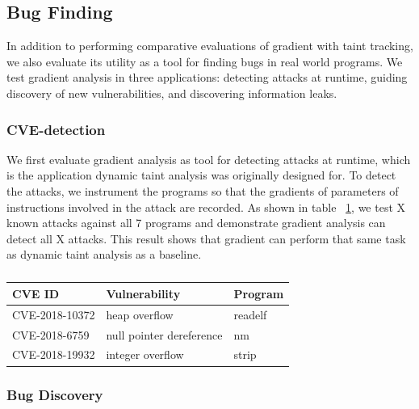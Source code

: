 \subsection{Bug Finding}

In addition to performing comparative evaluations of gradient with taint tracking, we also evaluate its utility as a tool for finding bugs in real world programs. We test gradient analysis in three applications: detecting attacks at runtime, guiding discovery of new vulnerabilities, and discovering information leaks.


\subsubsection{CVE-detection}

We first evaluate gradient analysis as tool for detecting attacks at runtime, which is the application dynamic taint analysis was originally designed for. To detect the attacks, we instrument the programs so that the gradients of parameters of instructions involved in the attack are recorded. As shown in table ~\ref{tab:cve_detection}, we test X known attacks against all 7 programs and demonstrate gradient analysis can detect all X attacks. This result shows that gradient can perform that same task as dynamic taint analysis as a baseline. 

\begin{table}
\begin{tabular}{l l l}
\toprule
CVE ID & Vulnerability & Program \\
\midrule
CVE-2018-10372 & heap overflow & readelf  \\
CVE-2018-6759 & null pointer dereference & nm  \\
CVE-2018-19932 & integer overflow & strip  \\
\bottomrule
\end{tabular}
\caption{}
  \label{tab:cve_detection}
\end{table}


\subsubsection{Bug Discovery}

